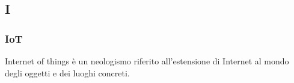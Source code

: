 \subsection*{\textbf{\hfill \Huge{I} \hfill}} 
\subsubsection*{IoT}
Internet of things è un neologismo riferito all'estensione di Internet al mondo degli oggetti e dei luoghi concreti.
